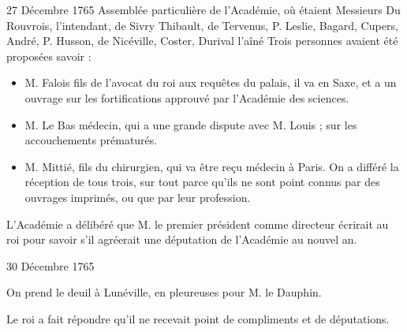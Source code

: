\begin{diary}{27 Décembre 1765}{}
                         Assemblée particulière de l'Académie, où
                           étaient Messieurs
                           Du Rouvrois, l'intendant, de
                              Sivry
                           Thibault, de Tervenus, P.
                              Leslie, Bagard,
                              Cupers,
                           André, P.
                              Husson, de Nicéville,
                              Coster, Durival l'aîné
                           Trois personnes avaient été proposées savoir : \begin{itemize}\item
                                 M. Falois fils de l'avocat du roi aux
                                    requêtes du
                                    palais, il va en Saxe, et a un ouvrage
                                    sur les
                                    fortifications
                                 approuvé par l'Académie des sciences. \item
                                 M. Le Bas médecin, qui a
                                 une grande dispute
                                 avec M. Louis ; sur les accouchements prématurés. \item
                                 M. Mittié, fils du chirurgien, qui va être
                                 reçu médecin à Paris.
                                 On a différé la réception de tous trois, sur tout parce qu'ils ne sont
                                 point connus par des ouvrages imprimés,
                                 ou que par leur profession. \end{itemize}
                        \bigskip



                           L'Académie a délibéré que M. le premier président
                           comme directeur écrirait au roi pour
                           savoir s'il agréerait une députation de
                           l'Académie au nouvel an. \bigskip


                     \end{diary}

                     \begin{diary}{30 Décembre 1765}{}

                         On prend le deuil à Lunéville, en pleureuses
                           pour M. le Dauphin. \bigskip



                           Le roi a fait répondre qu'il
                           ne recevait
                           point de compliments et de députations. \bigskip


                     \end{diary}

